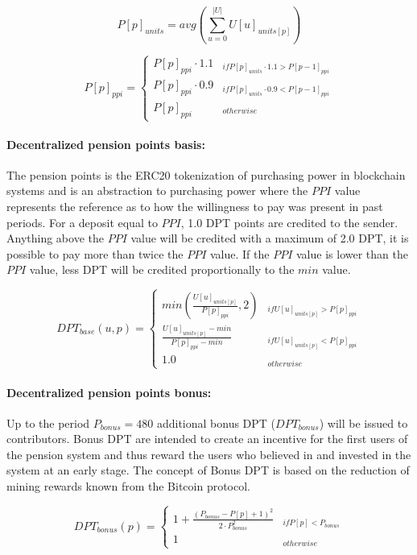 \begin{equation}
P[p]_{units} = avg(\sum_{u=0}^{|U|} U[u]_{units[p]})
\end{equation}

\begin{equation}
P[p]_{ppi} = \begin{cases} 
P[p]_{ppi} \cdot 1.1 & _{if P[p]_{units} \cdot 1.1 > P[p-1]_{ppi}} \\
P[p]_{ppi} \cdot 0.9 & _{if P[p]_{units} \cdot 0.9 < P[p-1]_{ppi}} \\
P[p]_{ppi} & _{otherwise}
\end{cases}
\end{equation}

\paragraph*{Decentralized pension points basis:}
The pension points is the ERC20 tokenization of purchasing power in blockchain systems and is an abstraction to purchasing power where the $PPI$ value represents the reference as to how the willingness to pay was present in past periods. For a deposit equal to $PPI$, 1.0 DPT points are credited to the sender. Anything above the $PPI$ value will be credited with a maximum of 2.0 DPT, it is possible to pay more than twice the $PPI$ value. If the $PPI$ value is lower than the $PPI$ value, less DPT will be credited proportionally to the $min$ value.

\begin{dmath}
DPT_{base}(u, p) = \begin{cases} 
min(\frac{U[u]_{units[p]}} {P[p]_{ppi}}, 2) 
  & _{if U[u]_{units[p]} > P[p]_{ppi}} \\
\frac{U[u]_{units[p]} - min} {P[p]_{ppi} - min} 
  & _{if U[u]_{units[p]} < P[p]_{ppi}} \\
1.0 & _{otherwise}
\end{cases}
\end{dmath}

\paragraph*{Decentralized pension points bonus:}
Up to the period $P_{bonus} = 480$ additional bonus DPT ($DPT_{bonus}$) will be issued to contributors. Bonus DPT are intended to create an incentive for the first users of the pension system and thus reward the users who believed in and invested in the system at an early stage. The concept of Bonus DPT is based on the reduction of mining rewards known from the Bitcoin protocol.

\begin{equation}
DPT_{bonus}(p) = \begin{cases} 
1 + \frac{(P_{bonus} - P[p] + 1)^2}
      {2 \cdot P_{bonus}^2} & _{if P[p] < P_{bonus}} \\
1 & _{otherwise} 
\end{cases}
\end{equation}